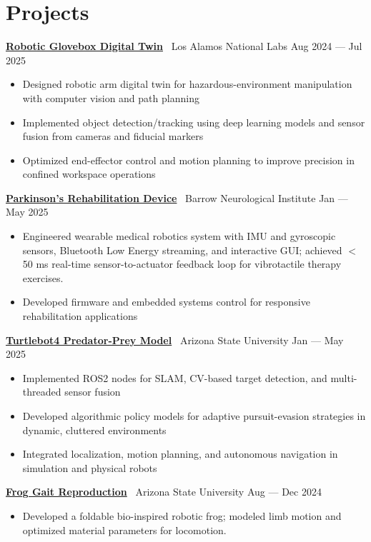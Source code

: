 \documentclass[10pt]{article}
\begin{document}
\section*{Projects}
\textbf{\href{https://github.com/MGross21/glovebox-digitaltwin}{Robotic Glovebox Digital Twin}} \textbar\ Los Alamos National Labs \hfill Aug 2024 --- Jul 2025
\begin{itemize}
  \item Designed robotic arm digital twin for hazardous-environment manipulation with computer vision and path planning
  \item Implemented object detection/tracking using deep learning models and sensor fusion from cameras and fiducial markers
  \item Optimized end-effector control and motion planning to improve precision in confined workspace operations
\end{itemize}
\textbf{\href{https://github.com/MGross21/syncstride-wearable}{Parkinson's Rehabilitation Device}} \textbar\ Barrow Neurological Institute \hfill Jan --- May 2025
\begin{itemize}
  \item Engineered wearable medical robotics system with IMU and gyroscopic sensors, Bluetooth Low Energy streaming, and interactive GUI; achieved $<$50 ms real-time sensor-to-actuator feedback loop for vibrotactile therapy exercises.
  \item Developed firmware and embedded systems control for responsive rehabilitation applications
\end{itemize}
\textbf{\href{https://ASU-RAS598-2025-S-TEAM02.github.io}{Turtlebot4 Predator-Prey Model}} \textbar\ Arizona State University \hfill Jan --- May 2025
\begin{itemize}
  \item Implemented ROS2 nodes for SLAM, CV-based target detection, and multi-threaded sensor fusion
  \item Developed algorithmic policy models for adaptive pursuit-evasion strategies in dynamic, cluttered environments
  \item Integrated localization, motion planning, and autonomous navigation in simulation and physical robots
\end{itemize}
\textbf{\href{https://github.com/MGross21/Robotic-Jumping-Frog}{Frog Gait Reproduction}} \textbar\ Arizona State University \hfill Aug --- Dec 2024
\begin{itemize}
  \item Developed a foldable bio-inspired robotic frog; modeled limb motion and optimized material parameters for locomotion.
\end{itemize}
\end{document}
